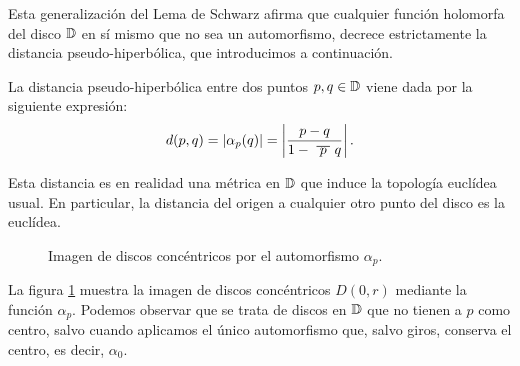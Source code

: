 Esta generalización del Lema de Schwarz afirma que cualquier función holomorfa del disco $\mathbb{D}$ en sí mismo que no sea un automorfismo, decrece estrictamente la distancia pseudo-hiperbólica, que introducimos a continuación. \\

\begin{definition}
    La distancia pseudo-hiperbólica entre dos puntos $p, q \in \mathbb{D}$ viene dada por la siguiente expresión:
    \begin{equation*}
        d(p,q) = \abs{\alpha_p(q)} = \abs{\frac{p-q}{1 - \xbar{p} q}}.
    \end{equation*}
\end{definition}

Esta distancia es en realidad una métrica en $\mathbb{D}$ que induce la topología euclídea usual. En particular, la distancia del origen a cualquier otro punto del disco es la euclídea. \\

\begin{figure}[!htbp]
    \begin{minipage}[h]{0.5\textwidth}
        \centering
        \label{fig:circulos1}
    \end{minipage} \hfill
     \begin{minipage}[h]{0.5\textwidth}
        \centering
        \label{fig:circulos2}
    \end{minipage}
    \caption{Imagen de discos concéntricos por el automorfismo $\alpha_p$.}
    \label{fig:automorfismo}
\end{figure}

La figura \ref{fig:automorfismo} muestra la imagen de discos concéntricos $D(0,r)$ mediante la función $\alpha_p$. Podemos observar que se trata de discos en $\mathbb{D}$ que no tienen a $p$ como centro, salvo cuando aplicamos el único automorfismo que, salvo giros, conserva el centro, es decir, $\alpha_0$. \\


